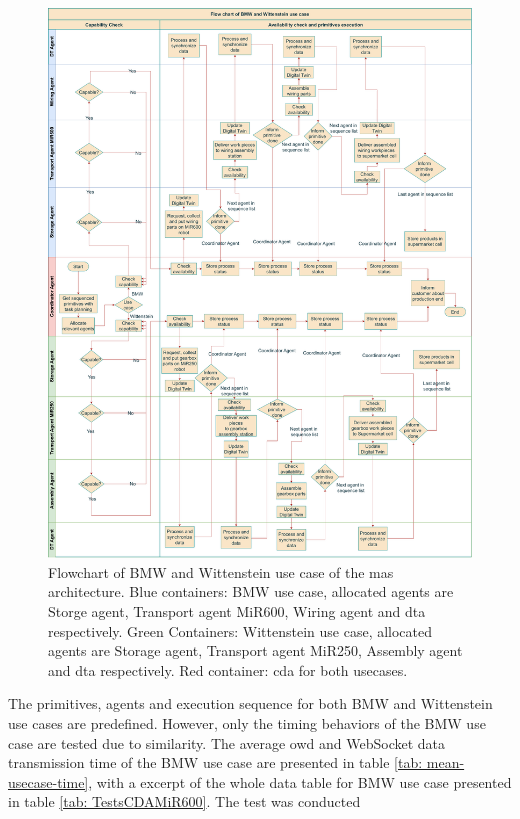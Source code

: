 \begin{figure}[htb]
    \centering
    \includegraphics[width=\textwidth]{figures/tests/usecase/Usecase_flow.pdf}\hfill 
    \caption{Flowchart of BMW and Wittenstein use case of the \gls{mas} architecture. 
    Blue containers: BMW use case, allocated agents are Storge agent, 
    Transport agent MiR600, Wiring agent and \gls{dta} respectively. 
    Green Containers: Wittenstein use case, allocated agents are Storage agent, 
    Transport agent MiR250, Assembly agent and \gls{dta} respectively. 
    Red container: \gls{cda} for both usecases.} 
    \label{fig: Flowchart-usecase}
\end{figure}
The primitives, agents and execution sequence for both BMW and Wittenstein use cases 
are predefined. However, only the timing behaviors of the BMW use case are tested due 
to similarity. The average \gls{owd} and WebSocket data transmission time of the BMW 
use case are presented in table \ref{tab: mean-usecase-time}, with a excerpt of the whole 
data table for BMW use case presented in table \ref{tab: TestsCDAMiR600}. The test was conducted 
